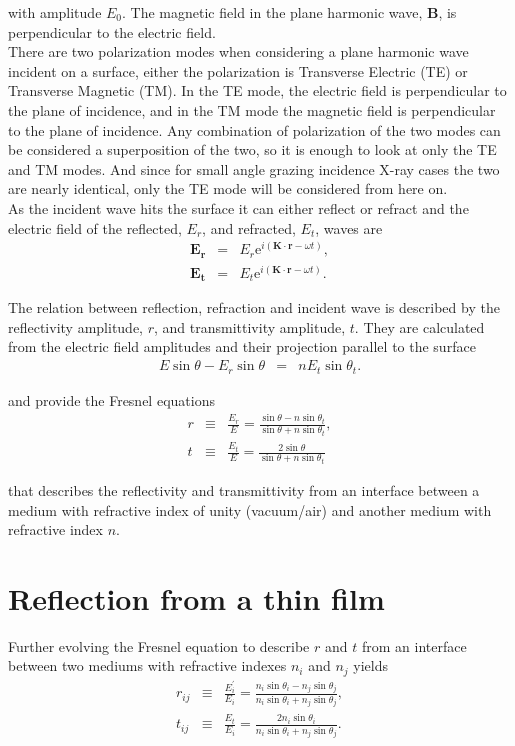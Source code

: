 with amplitude $E_0$. The magnetic field in the plane harmonic wave, $\mathbf{B}$, is perpendicular to the electric field.\\

There are two polarization modes when considering a plane harmonic wave incident on a surface, either the polarization is Transverse Electric (TE) or Transverse Magnetic (TM). In the TE mode, the electric field is perpendicular to the plane of incidence, and in the TM mode the magnetic field is perpendicular to the plane of incidence. Any combination of polarization of the two modes can be considered a superposition of the two, so it is enough to look at only the TE and TM modes. And since for small angle grazing incidence X-ray cases the two are nearly identical\cite{pedrotti:1993}, only the TE mode will be considered from here on. \\

As the incident wave hits the surface it can either reflect or refract and the electric field of the reflected, $E_r$, and refracted, $E_t$, waves are
\begin{eqnarray}
	\mathbf{E_r} & =  & E_r \mathrm{e}^{i(\mathbf{K}\cdot \mathbf{r}-\omega t)},\\
	\mathbf{E_t} & =  & E_t \mathrm{e}^{i(\mathbf{K}\cdot \mathbf{r}-\omega t)}.
\end{eqnarray}

The relation between reflection, refraction and incident wave is described by the reflectivity amplitude, $r$, and transmittivity amplitude, $t$. They are calculated from the electric field amplitudes and their projection parallel to the surface
\begin{eqnarray}
	E \sin{\theta} - E_r \sin{\theta} &=& n E_t \sin{\theta_t}.
\end{eqnarray}

and provide the Fresnel equations
\begin{eqnarray}\label{fresneleq}
	r & \equiv & \frac{E_r}{E} = \frac{\sin{\theta}-n \sin{\theta_t}}{\sin{\theta}+n \sin{\theta_t}}, \\
	t & \equiv & \frac{E_t}{E} = \frac{2\sin{\theta}}{\sin{\theta}+n \sin{\theta_t}}
\end{eqnarray}

that describes the reflectivity and transmittivity from an interface between a medium with refractive index of unity (vacuum/air) and another medium with refractive index $n$.

\section{Reflection from a thin film}
Further evolving the Fresnel equation to describe $r$ and $t$ from an interface between two mediums with refractive indexes $n_i$ and $n_j$ yields
\begin{eqnarray}
	r_{ij} & \equiv & \frac{E_i^{'}}{E_i} = \frac{n_i\sin{\theta_i}-n_j \sin{\theta_j}}{n_i\sin{\theta_i}+n_j \sin{\theta_j}}, \label{reflectivitetinterface}\\
	t_{ij} & \equiv & \frac{E_t}{E_i} = \frac{2 n_i\sin{\theta_i}}{n_i\sin{\theta_i}+n_j \sin{\theta_j}}.\label{transmittivity}
\end{eqnarray}

